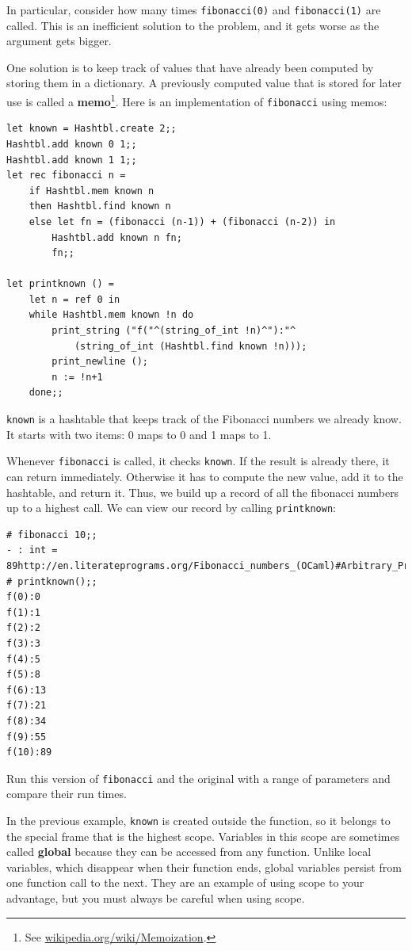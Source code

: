 \documentclass[10pt]{book}
\begin{document}

In particular, consider how many times {\tt fibonacci(0)} and {\tt fibonacci(1)} 
are called. This is an inefficient solution to the problem, and it gets
worse as the argument gets bigger.


One solution is to keep track of values that have already been
computed by storing them in a dictionary.  A previously computed value
that is stored for later use is called a {\bf memo}\footnote{See
  \url{wikipedia.org/wiki/Memoization}.}.  Here is an
implementation of {\tt fibonacci} using memos:

\beforeverb
\begin{verbatim}
let known = Hashtbl.create 2;;
Hashtbl.add known 0 1;;
Hashtbl.add known 1 1;;
let rec fibonacci n =
	if Hashtbl.mem known n
	then Hashtbl.find known n
	else let fn = (fibonacci (n-1)) + (fibonacci (n-2)) in
		Hashtbl.add known n fn;
		fn;;

let printknown () = 
	let n = ref 0 in
	while Hashtbl.mem known !n do
		print_string ("f("^(string_of_int !n)^"):"^
			(string_of_int (Hashtbl.find known !n)));
		print_newline ();
		n := !n+1
	done;;
\end{verbatim}
\afterverb
%
{\tt known} is a hashtable that keeps track of the Fibonacci
numbers we already know.  It starts with
two items: 0 maps to 0 and 1 maps to 1.

Whenever {\tt fibonacci} is called, it checks {\tt known}.
If the result is already there, it can return
immediately.  Otherwise it has to 
compute the new value, add it to the hashtable, and return it. 
Thus, we build up a record of all the fibonacci numbers up to 
a highest call. We can view our record by calling {\tt printknown}:

\beforeverb
\begin{verbatim}
# fibonacci 10;;
- : int = 89http://en.literateprograms.org/Fibonacci_numbers_(OCaml)#Arbitrary_Precision
# printknown();;
f(0):0
f(1):1
f(2):2
f(3):3
f(4):5
f(5):8
f(6):13
f(7):21
f(8):34
f(9):55
f(10):89
\end{verbatim}
\afterverb

\begin{ex}
Run this version of {\tt fibonacci} and the original with
a range of parameters and compare their run times.
\end{ex}

In the previous example, {\tt known} is created outside the function,
so it belongs to the special frame that is the highest scope.
Variables in this scope are sometimes called {\bf global}
because they can be accessed from any function.  Unlike local
variables, which disappear when their function ends, global variables
persist from one function call to the next. They are an example of using 
scope to your advantage, but you must always be careful when using scope.
\end{document}
